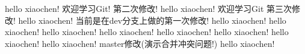 hello xiaochen! 欢迎学习Git! 第二次修改!
hello xiaochen! 欢迎学习Git  第三次修改!
hello xiaochen!  当前是在dev分支上做的第一次修改!
hello xiaochen!
hello xiaochen!
hello xiaochen!
hello xiaochen!
hello xiaochen!
hello xiaochen!
hello xiaochen!
hello xiaochen!  master修改(演示合并冲突问题!)
hello xiaochen!
